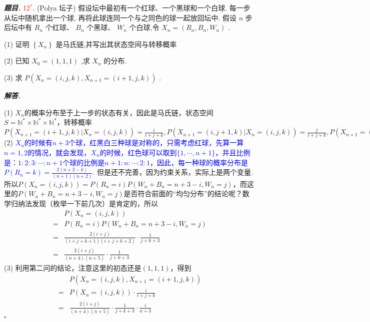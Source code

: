 \documentclass[10pt, a4paper, oneside]{ctexart}
\newenvironment{problem}{\begin{framed}\par\noindent\textbf{\textit{题目. }}}{\end{framed}\par}
\newenvironment{solution}{%
  \par\noindent\textbf{\textit{解答. }}\ignorespaces
}{%
  \hfill\ensuremath{\square}\par %
}
\begin{document}
\begin{problem}
\textcolor{red}{12$^*$}. (Polya 坛子) 假设坛中最初有一个红球、一个黑球和一个白球. 每一步从坛中随机拿出一个球, 再将此球连同一个与之同色的球一起放回坛中. 假设 \( n \) 步后坛中有 \( {R}_{n} \) 个红球、 \( {B}_{n} \) 个黑球、 \( {W}_{n} \) 个白球,令 \( {X}_{n} = \left( {{R}_{n},{B}_{n},{W}_{n}}\right) \) .

(1) 证明 \( \left\{ {X}_{n}\right\} \) 是马氏链,并写出其状态空间与转移概率

(2) 已知 \( {X}_{0} = \left( {1,1,1}\right) \) ,求 \( {X}_{n} \) 的分布.

(3) 求 \( P\left( {{X}_{n} = \left( {i,j,k}\right) ,{X}_{n + 1} = \left( {i + 1,j,k}\right) }\right) \) .
\end{problem}
\begin{solution}
(1) $X_{n}$的概率分布至于上一步的状态有关，因此是马氏链，状态空间$S=\mathbb{N}^*\times \mathbb{N}^* \times \mathbb{N}^*$，转移概率$P(X_{n+1}=(i+1,j,k)|X_{n}=(i,j,k))=\frac{i}{i+j+k},P(X_{n+1}=(i,j+1,k)|X_{n}=(i,j,k))=\frac{j}{i+j+k},P(X_{n+1}=(i,j,k+1)|X_{n}=(i,j,k))=\frac{k}{i+j+k},\;i+j+k=n+3$\\
(2) \textcolor{blue}{$X_n$的时候有$n+3$个球，红黑白三种球是对称的，只需考虑红球，先算一算$n=1,2$的情况，就会发现，$X_n$的时候，红色球可以取到$\{1,\cdots,n+1\}$，并且比例是：$1:2:3:\cdots:n+1$个球的比例是$n+1:n:\cdots:2:1$，因此，每一种球的概率分布是$P(R_n=k)=\frac{2(n+2-k)}{(n+1)(n+2)}$}. 但是还不完善，因为约束关系，实际上是两个变量. 所以$P(X_n=(i,j,k))=P(R_n=i)P(W_n+B_n=n+3-i,W_n=j)$，而这里的$P(W_n+B_n=n+3-i,W_n=j)$是否符合前面的“均匀分布”的结论呢？数学归纳法发现（枚举一下前几次）是肯定的，所以
\begin{align*}
&P(X_n=(i,j,k))\\
=&P(R_n=i)P(W_n+B_n=n+3-i,W_n=j)\\
=&\frac{2(i+j)}{(i+j+k+1)(i+j+k+2)}\cdot \frac{1}{j+k+3}\\
=&\frac{2(i+j)}{(n+4)(n+5)}\cdot \frac{1}{j+k+3}
\end{align*}
(3) 利用第二问的结论，注意这里的初态还是$(1,1,1)$，得到
\begin{align*}
&P\left( {{X}_{n} = \left( {i,j,k}\right) ,{X}_{n + 1} = \left( {i + 1,j,k}\right) }\right)\\
=&P({X}_{n} = \left( {i,j,k}\right))\cdot\frac{i}{i+j+k}\\
=& \frac{2(i+j)}{(n+4)(n+5)}\cdot \frac{1}{j+k+3} \cdot \frac{i}{n+3}
\end{align*}
\end{solution}
\end{document}
